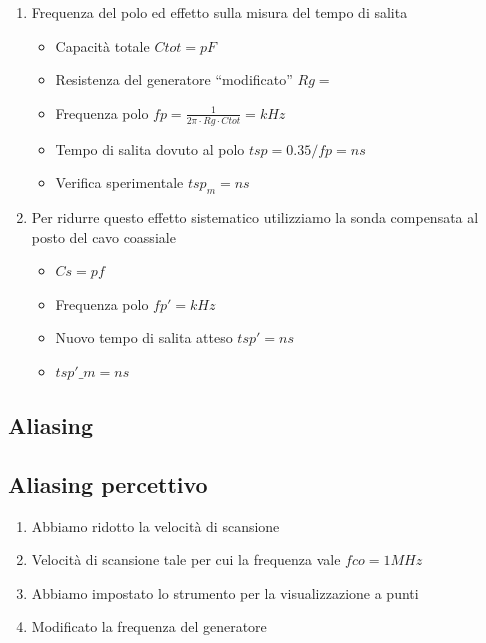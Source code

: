 \documentclass[a4paper]{article}
\begin{document}
\begin{enumerate}
\item Frequenza del polo ed effetto sulla misura del tempo di salita
  \begin{itemize}
    \item Capacità totale \(Ctot = pF\)
    \item Resistenza del generatore ``modificato'' \(Rg= \)
    \item Frequenza polo \(fp = \tfrac{1}{2\pi \cdot Rg \cdot Ctot} = kHz \)
    \item Tempo di salita dovuto al polo \(tsp= 0.35/fp = ns\)
    \item Verifica sperimentale \(tsp_m = ns\)
    \end{itemize}

\item Per ridurre questo effetto sistematico utilizziamo la sonda compensata al posto del cavo coassiale
 \begin{itemize}
 \item  \(Cs= pf\)
 \item Frequenza polo \(fp' = kHz\)
 \item Nuovo tempo di salita atteso \(tsp'= ns\)
 \item \(tsp'\_m= ns\)
 \end{itemize}
\end{enumerate}



\begin{tcolorbox}[breakable,colback=cyan,colframe=cyan]
\section*{Aliasing}
\end{tcolorbox}


\subsection{Aliasing percettivo}
 \begin{enumerate}
  \item Abbiamo ridotto la velocità di scansione
  \item Velocità di scansione tale per cui la frequenza vale \(fco= 1 MHz\)
  \item Abbiamo impostato lo strumento per la visualizzazione a punti
  \item Modificato la frequenza del generatore
 \end{enumerate}
\end{document}
